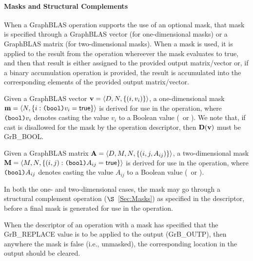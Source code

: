 \paragraph{Masks and Structural Complements}

%
%

When a GraphBLAS operation supports the use of an optional mask, that mask is
specified through a GraphBLAS vector (for one-dimensional masks) or
a GraphBLAS matrix (for two-dimensional masks).  When a mask is used, it is 
applied to the result from the operation whereever the mask evaluates to true, 
and then that result is either assigned 
to the provided output matrix/vector or, if a binary accumulation operation is 
provided, the result is accumulated into the corresponding elements of the provided 
output matrix/vector.

Given a GraphBLAS vector ${\bf v} = \langle D,N, \{ (i,v_i) \} \rangle$, a
one-dimensional mask ${\bf m} = \langle N, \{ i : \mbox{\tt (bool)}v_i = {\sf true} \} \rangle$
is derived for use in the operation, where $\mbox{\tt (bool)}v_i$ denotes
casting the value $v_i$ to a Boolean value (\true\ or \false).
We note that, if cast is disallowed for the mask by the operation descriptor, then
$\bold{D}({\bf v})$ must be {\sf GrB\_BOOL}.

Given a GraphBLAS matrix ${\bf A} = \langle D, M, N, \{ (i,j,A_{ij}) \} \rangle$,
a two-dimensional mask ${\bf M} = \langle M,N, \{ (i,j) : \mbox{\tt (bool)}A_{ij} = {\sf true} \} \rangle$
is derived for use in the operation, where $\mbox{\tt (bool)}A_{ij}$ denotes
casting the value $A_{ij}$ to a Boolean value (\true\ or \false).

In both the one- and two-dimensional cases, the mask may go through a structural
complement operation ($\S$~\ref{Sec:Masks}) as specified in the descriptor, before 
a final mask is generated for use in the operation.

When the descriptor of an operation with a mask has specified that 
the {\sf GrB\_REPLACE} value is to be applied to the output ({\sf GrB\_OUTP}),
then anywhere the mask is false (i.e., unmasked), the corresponding location in
the output should be cleared.

 
